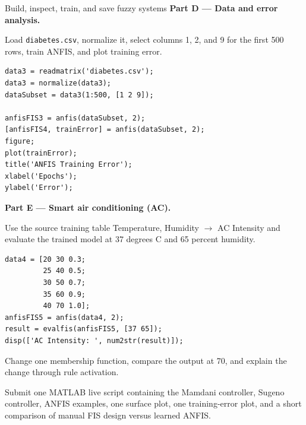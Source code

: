 \begin{labproject}{Build, inspect, train, and save fuzzy systems}
\medskip\noindent\textbf{Part D --- Data and error analysis.}\par
Load \texttt{diabetes.csv}, normalize it, select columns 1, 2, and 9 for the first 500 rows, train ANFIS, and plot training error.

\begin{lstlisting}[style=mlmatlab]
data3 = readmatrix('diabetes.csv');
data3 = normalize(data3);
dataSubset = data3(1:500, [1 2 9]);

anfisFIS3 = anfis(dataSubset, 2);
[anfisFIS4, trainError] = anfis(dataSubset, 2);
figure;
plot(trainError);
title('ANFIS Training Error');
xlabel('Epochs');
ylabel('Error');
\end{lstlisting}

\medskip\noindent\textbf{Part E --- Smart air conditioning (AC).}\par
Use the source training table Temperature, Humidity $\to$ AC Intensity and evaluate the trained model at 37 degrees C and 65 percent humidity.

\begin{lstlisting}[style=mlmatlab]
data4 = [20 30 0.3;
         25 40 0.5;
         30 50 0.7;
         35 60 0.9;
         40 70 1.0];
anfisFIS5 = anfis(data4, 2);
result = evalfis(anfisFIS5, [37 65]);
disp(['AC Intensity: ', num2str(result)]);
\end{lstlisting}

\begin{tryit}
Change one membership function, compare the output at 70, and explain the change through rule activation.
\end{tryit}
\end{labproject}

\begin{labdeliverable}
Submit one MATLAB live script containing the Mamdani controller, Sugeno controller, ANFIS examples, one surface plot, one training-error plot, and a short comparison of manual FIS design versus learned ANFIS.
\end{labdeliverable}
